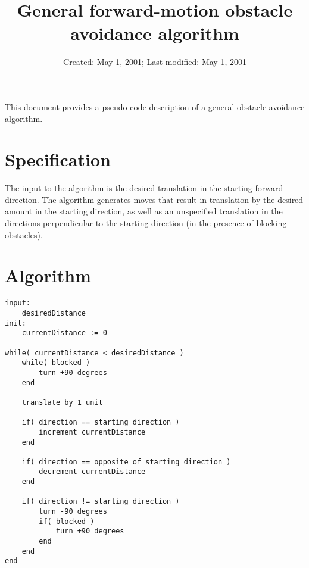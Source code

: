 \documentclass[12pt]{article}
\begin{document}
\title{General forward-motion obstacle avoidance algorithm}
\date{Created: May 1, 2001;  Last modified: May 1, 2001}

\maketitle

This document provides a pseudo-code description of a general obstacle avoidance algorithm.  

\section{Specification}
The input to the algorithm is the desired translation in the starting forward direction.  The algorithm generates moves that result in translation by the desired amount in the starting direction, as well as an unspecified translation in the directions perpendicular to the starting direction (in the presence of blocking obstacles).

\newpage

\section{Algorithm}
\begin{verbatim}
input:  
    desiredDistance
init:
    currentDistance := 0

while( currentDistance < desiredDistance )
    while( blocked )
        turn +90 degrees
    end

    translate by 1 unit 

    if( direction == starting direction ) 
        increment currentDistance 
    end

    if( direction == opposite of starting direction )
        decrement currentDistance
    end

    if( direction != starting direction )
        turn -90 degrees
        if( blocked )
            turn +90 degrees
        end
    end
end
\end{verbatim}
\end{document}
